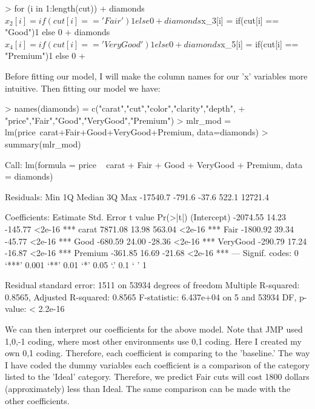\documentclass{article}
\begin{document}
\begin{Schunk}
\begin{Sinput}
> for (i in 1:length(cut)){
+ diamonds$x_2[i] = if(cut[i] == 'Fair'){1} else {0}
+ diamonds$x_3[i] = if(cut[i] == "Good"){1} else {0}
+ diamonds$x_4[i] = if(cut[i] == 'Very Good'){1} else {0}
+ diamonds$x_5[i] = if(cut[i] == "Premium"){1} else {0}
+ }
\end{Sinput}
\end{Schunk}

Before fitting our model, I will make the column names for our 'x' variables more intuitive.  Then fitting our model we have:

\begin{Schunk}
\begin{Sinput}
> names(diamonds) = c("carat","cut","color","clarity","depth",
+                     "price","Fair","Good","VeryGood","Premium") 
> mlr_mod = lm(price~carat+Fair+Good+VeryGood+Premium, data=diamonds)
> summary(mlr_mod)
\end{Sinput}
\begin{Soutput}
Call:
lm(formula = price ~ carat + Fair + Good + VeryGood + Premium, 
    data = diamonds)

Residuals:
     Min       1Q   Median       3Q      Max 
-17540.7   -791.6    -37.6    522.1  12721.4 

Coefficients:
            Estimate Std. Error t value Pr(>|t|)    
(Intercept) -2074.55      14.23 -145.77   <2e-16 ***
carat        7871.08      13.98  563.04   <2e-16 ***
Fair        -1800.92      39.34  -45.77   <2e-16 ***
Good         -680.59      24.00  -28.36   <2e-16 ***
VeryGood     -290.79      17.24  -16.87   <2e-16 ***
Premium      -361.85      16.69  -21.68   <2e-16 ***
---
Signif. codes:  0 ‘***’ 0.001 ‘**’ 0.01 ‘*’ 0.05 ‘.’ 0.1 ‘ ’ 1

Residual standard error: 1511 on 53934 degrees of freedom
Multiple R-squared:  0.8565,	Adjusted R-squared:  0.8565 
F-statistic: 6.437e+04 on 5 and 53934 DF,  p-value: < 2.2e-16
\end{Soutput}
\end{Schunk}

We can then interpret our coefficients for the above model.  Note that JMP used 1,0,-1 coding, where most other environments use 0,1 coding.  Here I created my own 0,1 coding.  Therefore, each coefficient is comparing to the 'baseline.' The way I have coded the dummy variables each coefficient is a comparison of the category listed to the 'Ideal' category.  Therefore, we predict Fair cuts will cost 1800 dollars (approximately) less than Ideal.  The same comparison can be made with the other coefficients.\\[.25cm]
\end{document}
